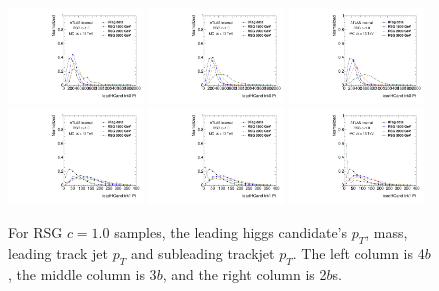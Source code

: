 \begin{figure}[htbp!]
\begin{center}
\includegraphics[angle=270, width=0.32\textwidth]{./figures/boosted/Truth/Moriond_comp_0_FourTag_Signal_leadHCand_trk0_Pt.pdf}
\includegraphics[angle=270, width=0.32\textwidth]{./figures/boosted/Truth/Moriond_comp_0_ThreeTag_Signal_leadHCand_trk0_Pt.pdf}
\includegraphics[angle=270, width=0.32\textwidth]{./figures/boosted/Truth/Moriond_comp_0_TwoTag_split_Signal_leadHCand_trk0_Pt.pdf}\\
\includegraphics[angle=270, width=0.32\textwidth]{./figures/boosted/Truth/Moriond_comp_0_FourTag_Signal_leadHCand_trk1_Pt.pdf}
\includegraphics[angle=270, width=0.32\textwidth]{./figures/boosted/Truth/Moriond_comp_0_ThreeTag_Signal_leadHCand_trk1_Pt.pdf}
\includegraphics[angle=270, width=0.32\textwidth]{./figures/boosted/Truth/Moriond_comp_0_TwoTag_split_Signal_leadHCand_trk1_Pt.pdf}\\
\caption{For RSG $c=1.0$ samples, the leading higgs candidate's $p_T$, mass, leading track jet $p_T$ and subleading trackjet $p_T$. The left column is 4$b$, the middle column is 3$b$, and the right column is 2$b$s.}
\label{fig:app-signal-leadHCand}
\end{center}
\end{figure}



